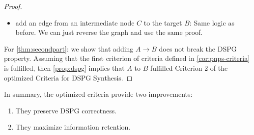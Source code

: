 \begin{proof}
\begin{itemize}
        \item add an edge from an intermediate node $C$ to the target $B$: Same logic as before. We can just reverse the graph and use the same proof.
    \end{itemize}

    
For \ref{thm:secondpart}: we show that adding $A \to B$ does not break the \ac{DSPG} property. Assuming that the first criterion of criteria defined in \cref{cor:pnps-criteria} is fulfilled, then \cref{prop:dspg} implies that $A$ to $B$ fulfilled Criterion 2 of the optimized Criteria for \ac{DSPG} Synthesis.
\end{proof}





In summary, the optimized criteria provide two improvements:
\begin{enumerate}
    \item They preserve \ac{DSPG} correctness.
    \item They maximize information retention.
\end{enumerate}

